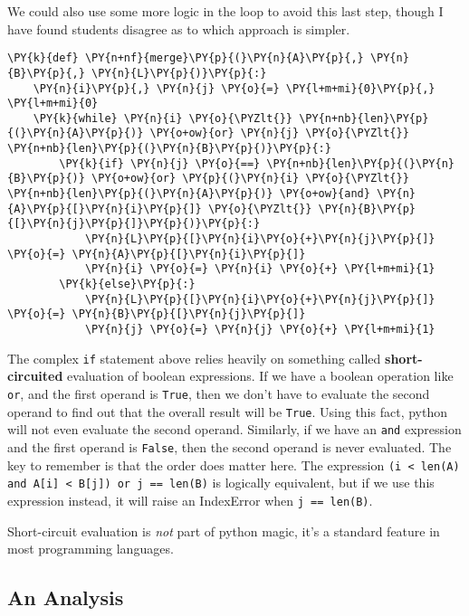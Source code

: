 We could also use some more logic in the loop to avoid this last step, though I have found students disagree as to which approach is simpler.

\begin{Verbatim}[commandchars=\\\{\}]
\PY{k}{def} \PY{n+nf}{merge}\PY{p}{(}\PY{n}{A}\PY{p}{,} \PY{n}{B}\PY{p}{,} \PY{n}{L}\PY{p}{)}\PY{p}{:}   
    \PY{n}{i}\PY{p}{,} \PY{n}{j} \PY{o}{=} \PY{l+m+mi}{0}\PY{p}{,} \PY{l+m+mi}{0}
    \PY{k}{while} \PY{n}{i} \PY{o}{\PYZlt{}} \PY{n+nb}{len}\PY{p}{(}\PY{n}{A}\PY{p}{)} \PY{o+ow}{or} \PY{n}{j} \PY{o}{\PYZlt{}} \PY{n+nb}{len}\PY{p}{(}\PY{n}{B}\PY{p}{)}\PY{p}{:}
        \PY{k}{if} \PY{n}{j} \PY{o}{==} \PY{n+nb}{len}\PY{p}{(}\PY{n}{B}\PY{p}{)} \PY{o+ow}{or} \PY{p}{(}\PY{n}{i} \PY{o}{\PYZlt{}} \PY{n+nb}{len}\PY{p}{(}\PY{n}{A}\PY{p}{)} \PY{o+ow}{and} \PY{n}{A}\PY{p}{[}\PY{n}{i}\PY{p}{]} \PY{o}{\PYZlt{}} \PY{n}{B}\PY{p}{[}\PY{n}{j}\PY{p}{]}\PY{p}{)}\PY{p}{:}
            \PY{n}{L}\PY{p}{[}\PY{n}{i}\PY{o}{+}\PY{n}{j}\PY{p}{]} \PY{o}{=} \PY{n}{A}\PY{p}{[}\PY{n}{i}\PY{p}{]}
            \PY{n}{i} \PY{o}{=} \PY{n}{i} \PY{o}{+} \PY{l+m+mi}{1}
        \PY{k}{else}\PY{p}{:}
            \PY{n}{L}\PY{p}{[}\PY{n}{i}\PY{o}{+}\PY{n}{j}\PY{p}{]} \PY{o}{=} \PY{n}{B}\PY{p}{[}\PY{n}{j}\PY{p}{]}
            \PY{n}{j} \PY{o}{=} \PY{n}{j} \PY{o}{+} \PY{l+m+mi}{1}
\end{Verbatim}



The complex \texttt{if} statement above relies heavily on something called \textbf{short-circuited} evaluation of boolean expressions.
If we have a boolean operation like \texttt{or}, and the first operand is \texttt{True}, then we don't have to evaluate the second operand to find out that the overall result will be \texttt{True}.
Using this fact, python will not even evaluate the second operand.
Similarly, if we have an \texttt{and} expression and the first operand is \texttt{False}, then the second operand is never evaluated.
The key to remember is that the order does matter here.
The expression \texttt{(i < len(A) and A[i] < B[j]) or j == len(B)} is logically equivalent, but if we use this  expression instead, it will raise an IndexError when \texttt{j == len(B)}.


Short-circuit evaluation is \emph{not} part of python magic, it's a standard feature in most programming languages.

\subsection{An Analysis}


